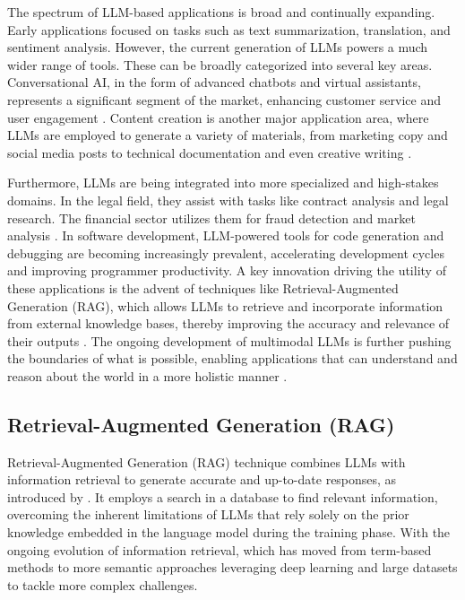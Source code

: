        The spectrum of LLM-based applications is broad and continually expanding. Early applications focused on tasks such as text summarization, translation, and sentiment analysis. However, the current generation of LLMs powers a much wider range of  tools. These can be broadly categorized into several key areas. Conversational AI, in the form of advanced chatbots and virtual assistants, represents a significant segment of the market, enhancing customer service and user engagement \citep{GrandViewResearch2025}. Content creation is another major application area, where LLMs are employed to generate a variety of materials, from marketing copy and social media posts to technical documentation and even creative writing \citep{V7Labs2025}.
        
        
        Furthermore, LLMs are being integrated into more specialized and high-stakes domains. In the legal field, they assist with tasks like contract analysis and legal research. The financial sector utilizes them for fraud detection and market analysis \citep{V7Labs2025}. In software development, LLM-powered tools for code generation and debugging are becoming increasingly prevalent, accelerating development cycles and improving programmer productivity. A key innovation driving the utility of these applications is the advent of techniques like Retrieval-Augmented Generation (RAG), which allows LLMs to retrieve and incorporate information from external knowledge bases, thereby improving the accuracy and relevance of their outputs \citep{KeywordsAI2025}. The ongoing development of multimodal LLMs is further pushing the boundaries of what is possible, enabling applications that can understand and reason about the world in a more holistic manner \citep{Kaddour2023}.
        
        \subsection{Retrieval-Augmented Generation (RAG)} 

            Retrieval-Augmented Generation (RAG) technique combines LLMs with information retrieval to generate accurate and up-to-date responses, as introduced by \citet{Lewis2020}. 
            It employs a search in a database to find relevant information, overcoming the inherent limitations of LLMs that rely solely on the prior knowledge embedded in the language model during the training phase. 
            With the ongoing evolution of information retrieval, which has moved from term-based methods to more semantic approaches leveraging deep learning and large datasets to tackle more complex challenges.
            
